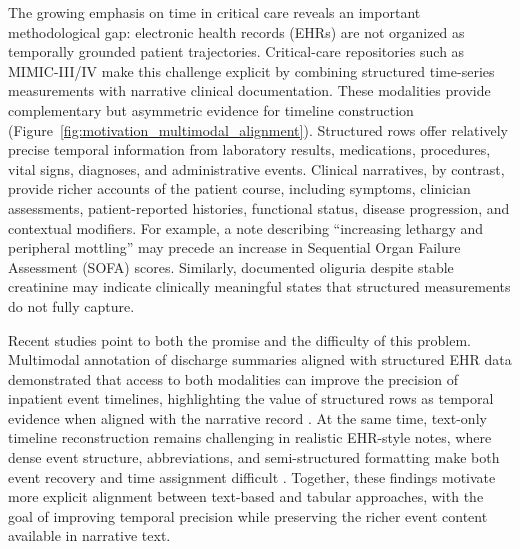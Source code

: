 \documentclass{ws-procs11x85}
\begin{document}
The growing emphasis on time in critical care reveals an important methodological gap: electronic health records (EHRs) are not organized as temporally grounded patient trajectories. Critical-care repositories such as MIMIC-III/IV \cite{johnson2016mimic,johnson2023mimic} make this challenge explicit by combining structured time-series measurements with narrative clinical documentation. These modalities provide complementary but asymmetric evidence for timeline construction (Figure~\ref{fig:motivation_multimodal_alignment}). Structured rows offer relatively precise temporal information from laboratory results, medications, procedures, vital signs, diagnoses, and administrative events. Clinical narratives, by contrast, provide richer accounts of the patient course, including symptoms, clinician assessments, patient-reported histories, functional status, disease progression, and contextual modifiers. For example, a note describing ``increasing lethargy and peripheral mottling'' may precede an increase in Sequential Organ Failure Assessment (SOFA) scores. Similarly, documented oliguria despite stable creatinine may indicate clinically meaningful states that structured measurements do not fully capture. 

Recent studies point to both the promise and the difficulty of this problem. Multimodal annotation of discharge summaries aligned with structured EHR data demonstrated that access to both modalities can improve the precision of inpatient event timelines, highlighting the value of structured rows as temporal evidence when aligned with the narrative record \cite{frattallone2024using}. At the same time, text-only timeline reconstruction remains challenging in realistic EHR-style notes, where dense event structure, abbreviations, and semi-structured formatting make both event recovery and time assignment difficult \cite{noroozizadeh2026reconstructing, noroozizadeh2026forecasting}. Together, these findings motivate more explicit alignment between text-based and tabular approaches, with the goal of improving temporal precision while preserving the richer event content available in narrative text.\cite{moldwin2021empirical,seinen2025using}
\end{document}

